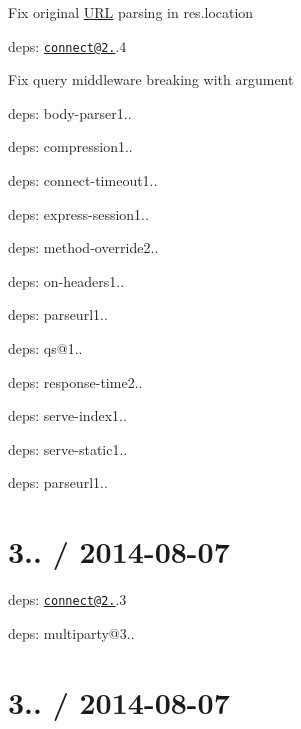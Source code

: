 {\ttfamily 
\begin{DoxyItemize}
\item Fix original \mbox{\hyperlink{namespace_u_r_l}{U\+RL}} parsing in {\ttfamily res.\+location}
\item deps\+: \href{mailto:connect@2.25}{\tt connect@2.}.4
\begin{DoxyItemize}
\item Fix {\ttfamily query} middleware breaking with argument
\item deps\+: body-\/parser1..
\item deps\+: compression1..
\item deps\+: connect-\/timeout1..
\item deps\+: express-\/session1..
\item deps\+: method-\/override2..
\item deps\+: on-\/headers1..
\item deps\+: parseurl1..
\item deps\+: qs@1..
\item deps\+: response-\/time2..
\item deps\+: serve-\/index1..
\item deps\+: serve-\/static1..
\end{DoxyItemize}
\item deps\+: parseurl1..
\end{DoxyItemize}}

{\ttfamily \section*{3.. / 2014-\/08-\/07 }}

{\ttfamily }

{\ttfamily 
\begin{DoxyItemize}
\item deps\+: \href{mailto:connect@2.25}{\tt connect@2.}.3
\begin{DoxyItemize}
\item deps\+: multiparty@3..
\end{DoxyItemize}
\end{DoxyItemize}}

{\ttfamily \section*{3.. / 2014-\/08-\/07 }}

{\ttfamily }

